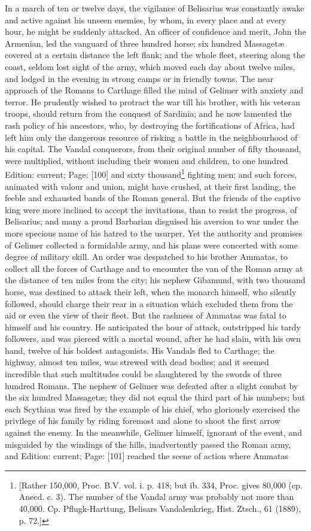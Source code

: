 In a march of ten or twelve days, the vigilance of Belisarius was constantly awake and active against his unseen enemies, by whom, in every place and at every hour, he might be suddenly attacked. An officer of confidence and merit, John the Armenian, led the vanguard of three hundred horse; six hundred Massagetæ covered at a certain distance the left flank; and the whole fleet, steering along the coast, seldom lost sight of the army, which moved each day about twelve miles, and lodged in the evening in strong camps or in friendly towns. The near approach of the Romans to Carthage filled the mind of Gelimer with anxiety and terror. He prudently wished to protract the war till his brother, with his veteran troops, should return from the conquest of Sardinia; and he now lamented the rash policy of his ancestors, who, by destroying the fortifications of Africa, had left him only the dangerous resource of risking a battle in the neighbourhood of his capital. The Vandal conquerors, from their original number of fifty thousand, were multiplied, without including their women and children, to one hundred Edition: current; Page: [100] and sixty thousand\footnote{[Rather 150,000, Proc. B.V. vol. i. p. 418; but ib. 334, Proc. gives 80,000 (cp. Anecd. c. 3). The number of the Vandal army was probably not more than 40,000. Cp. Pflugk-Harttung, Belisars Vandalenkrieg, Hist. Ztsch., 61 (1889), p. 72.]} fighting men; and such forces, animated with valour and union, might have crushed, at their first landing, the feeble and exhausted bands of the Roman general. But the friends of the captive king were more inclined to accept the invitations, than to resist the progress, of Belisarius; and many a proud Barbarian disguised his aversion to war under the more specious name of his hatred to the usurper. Yet the authority and promises of Gelimer collected a formidable army, and his plans were concerted with some degree of military skill. An order was despatched to his brother Ammatas, to collect all the forces of Carthage and to encounter the van of the Roman army at the distance of ten miles from the city; his nephew Gibamund, with two thousand horse, was destined to attack their left, when the monarch himself, who silently followed, should charge their rear in a situation which excluded them from the aid or even the view of their fleet. But the rashness of Ammatas was fatal to himself and his country. He anticipated the hour of attack, outstripped his tardy followers, and was pierced with a mortal wound, after he had slain, with his own hand, twelve of his boldest antagonists. His Vandals fled to Carthage; the highway, almost ten miles, was strewed with dead bodies; and it seemed incredible that such multitudes could be slaughtered by the swords of three hundred Romans. The nephew of Gelimer was defeated after a slight combat by the six hundred Massagetæ; they did not equal the third part of his numbers; but each Scythian was fired by the example of his chief, who gloriously exercised the privilege of his family by riding foremost and alone to shoot the first arrow against the enemy. In the meanwhile, Gelimer himself, ignorant of the event, and misguided by the windings of the hills, inadvertently passed the Roman army, and Edition: current; Page: [101] reached the scene of action where Ammatas 